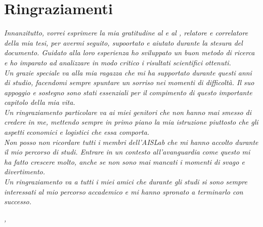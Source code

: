 
\cleardoublepage
{}
{}

\bigskip

\begingroup
\let\clearpage\relax
\let\cleardoublepage\relax
\let\cleardoublepage\relax

\chapter*{Ringraziamenti}

\noindent \textit{Innanzitutto, vorrei esprimere la mia gratitudine al \profTitle\:  \myProf e al \correlatoreTitle\: \myCorrelatore, relatore e correlatore della mia tesi, per avermi seguito, supoortato e aiutato durante la stesura del documento. Guidato alla loro esperienza ho sviluppato un buon metodo di ricerca e ho imparato ad analizzare in modo critico i risultati scientifici ottenuti.}\\

\noindent \textit{Un grazie speciale va alla mia ragazza che mi ha supportato durante questi anni di studio, facendomi sempre spuntare un sorriso nei momenti di difficoltà. Il suo appoggio e sostegno sono stati essenziali per il compimento di questo importante capitolo della mia vita. }\\

\noindent \textit{Un ringraziamento particolare va ai miei genitori che non hanno mai smesso di credere in me, mettendo sempre in primo piano la mia istruzione piuttosto che gli aspetti economici e logistici che essa comporta.}\\

\noindent \textit{Non posso non ricordare tutti i membri dell'AISLab che mi hanno accolto durante il mio percorso di studi. Entrare in un contesto all'avanguardia come questo mi ha fatto crescere molto, anche se non sono mai mancati i momenti di svago e divertimento.}\\

\noindent \textit{Un ringraziamento va a tutti i miei amici che durante gli studi si sono sempre interessati al mio percorso accademico e mi hanno spronato a terminarlo con successo.}\\

\bigskip

\noindent\textit{\myLocation, \myTime}
\hfill \myName

\endgroup

